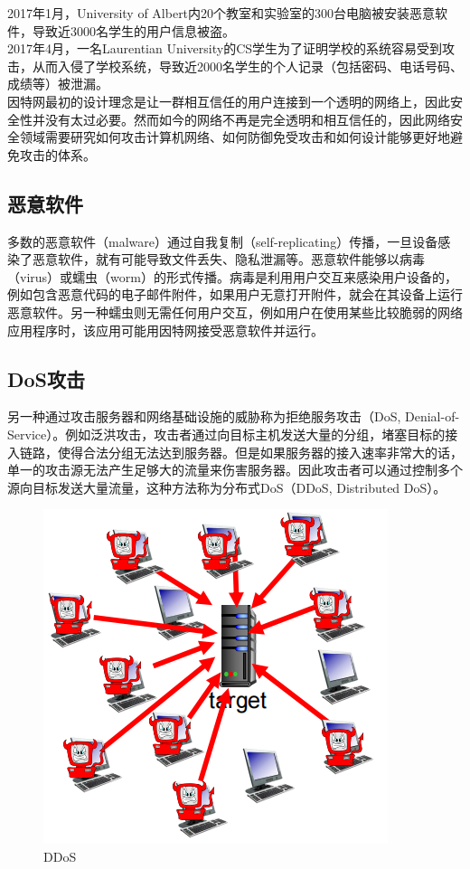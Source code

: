 2017年1月，University of Albert内20个教室和实验室的300台电脑被安装恶意软件，导致近3000名学生的用户信息被盗。\\

2017年4月，一名Laurentian University的CS学生为了证明学校的系统容易受到攻击，从而入侵了学校系统，导致近2000名学生的个人记录（包括密码、电话号码、成绩等）被泄漏。\\

因特网最初的设计理念是让一群相互信任的用户连接到一个透明的网络上，因此安全性并没有太过必要。然而如今的网络不再是完全透明和相互信任的，因此网络安全领域需要研究如何攻击计算机网络、如何防御免受攻击和如何设计能够更好地避免攻击的体系。\\

\subsection{恶意软件}

多数的恶意软件（malware）通过自我复制（self-replicating）传播，一旦设备感染了恶意软件，就有可能导致文件丢失、隐私泄漏等。恶意软件能够以病毒（virus）或蠕虫（worm）的形式传播。病毒是利用用户交互来感染用户设备的，例如包含恶意代码的电子邮件附件，如果用户无意打开附件，就会在其设备上运行恶意软件。另一种蠕虫则无需任何用户交互，例如用户在使用某些比较脆弱的网络应用程序时，该应用可能用因特网接受恶意软件并运行。\\

\subsection{DoS攻击}

另一种通过攻击服务器和网络基础设施的威胁称为拒绝服务攻击（DoS, Denial-of-Service）。例如泛洪攻击，攻击者通过向目标主机发送大量的分组，堵塞目标的接入链路，使得合法分组无法达到服务器。但是如果服务器的接入速率非常大的话，单一的攻击源无法产生足够大的流量来伤害服务器。因此攻击者可以通过控制多个源向目标发送大量流量，这种方法称为分布式DoS（DDoS, Distributed DoS）。\\

\begin{figure}[H]
    \centering
    \includegraphics[scale=0.6]{img/C1/1-4/1.png}
    \caption{DDoS}
\end{figure}

